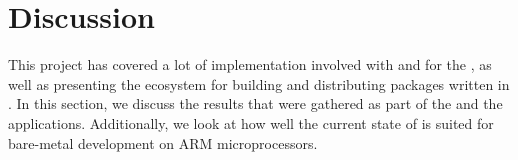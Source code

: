 
\chapter{Discussion}
\label{chap:discussion}

This project has covered a lot of implementation involved with {\rust} and {\C} for the {\gecko}, as well as presenting the ecosystem for building and distributing packages written in {\rust}.
In this section, we discuss the results that were gathered as part of the {\tracker} and the {\cg} applications.
Additionally, we look at how well the current state of {\rust} is suited for bare-metal development on ARM microprocessors.





%
